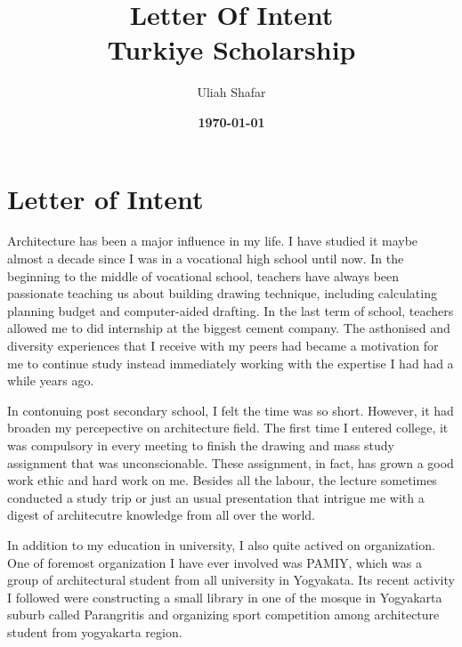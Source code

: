 \documentclass[12pt]{simart} %
\title{
\textbf{Letter Of Intent}\\
{Turkiye Scholarship} \\
} %
\date{\textbf{\today}}
\author{Uliah Shafar}
\begin{document}
\maketitle %

\vspace{30pt} %

\section{Letter of Intent}

Architecture has been a major influence in my life.
I have studied it maybe almost a decade since I was in a vocational high school until now.
In the beginning to the middle of vocational school, teachers have always been passionate teaching us about building drawing technique, including calculating planning budget and computer-aided drafting.
In the last term of school, teachers allowed me to did internship at the biggest cement company.
The asthonised and diversity experiences that I receive with my peers had became a motivation for me to continue study instead immediately working with the expertise I had had a while years ago.

In contonuing post secondary school, I felt the time was so short. However, it had broaden my percepective on architecture field.
The first time I entered college, it was compulsory in every meeting to finish the drawing and mass study assignment that was unconscionable.
These assignment, in fact, has grown a good work ethic and hard work on me.
Besides all the labour, the lecture sometimes conducted a study trip or just an usual presentation that intrigue me with a digest of architecutre knowledge from all over the world.

In addition to my education in university, I also quite actived on organization. One of foremost organization I have ever involved was PAMIY, which was a group of architectural student from all university in Yogyakata. Its recent activity I followed were constructing a small library in one of the mosque in Yogyakarta suburb called Parangritis and organizing sport competition among architecture student from yogyakarta region.
\end{document}
